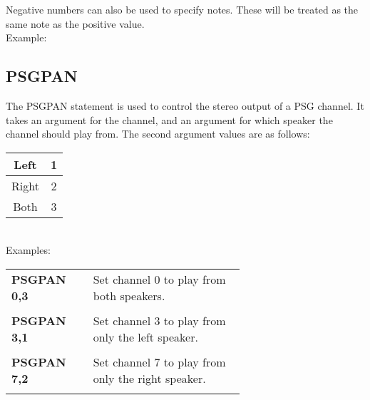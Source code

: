 Negative numbers can also be used to specify notes.  These will be treated as
the same note as the positive value.\\

Example:\\


\subsection{PSGPAN}

The {\ttfamily PSGPAN} statement is used to control the stereo output of a PSG
channel.  It takes an argument for the channel, and an argument for which
speaker the channel should play from.  The second argument values are as
follows:\\ 

\begin{tabular}{|c|c|}
	\hline
	Left & 1 \\ \hline
	Right & 2 \\ \hline
	Both & 3 \\ \hline
\end{tabular}\\

Examples:\\

\begin{tabular}{l p{0.65\linewidth}}

	{\ttfamily\bfseries PSGPAN 0,3}&Set channel 0 to play from both speakers.\\\\

	{\ttfamily\bfseries PSGPAN 3,1}&Set channel 3 to play from only the left speaker.\\\\

	{\ttfamily\bfseries PSGPAN 7,2}&Set channel 7 to play from only the right speaker.\\\\

\end{tabular}

